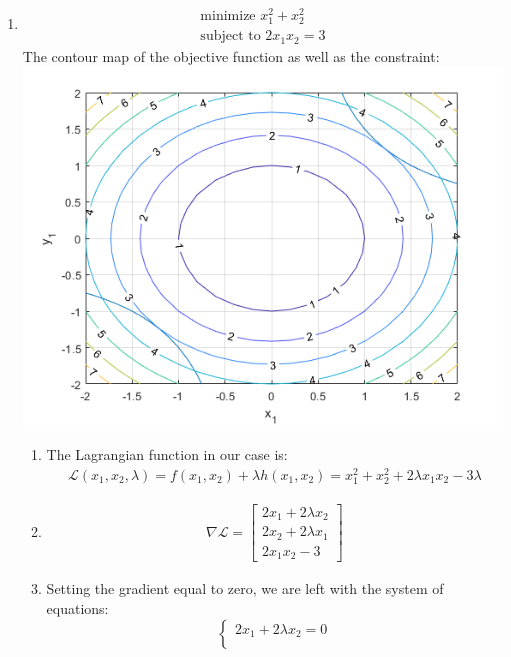 \documentclass[12pt,english]{article}
\begin{document}
\begin{enumerate}
    \item 
    \begin{gather*}
        \text{minimize } x_1^2 + x_2^2 \\
        \text{subject to } 2x_1x_2 = 3
    \end{gather*}
    The contour map of the objective function as well as the constraint: \\
    \includegraphics{a.png}
    \begin{enumerate}
        \item 
        The Lagrangian function in our case is: 
        \begin{gather*}
            \mathcal{L}(x_1, x_2, \lambda) = f(x_1, x_2) + \lambda h(x_1, x_2) = 
            x_1^2 + x_2^2 + 2\lambda x_1x_2 - 3\lambda
        \end{gather*}
        \item
        \begin{gather*}
            \nabla \mathcal{L} = 
            \begin{bmatrix}
                2x_1 + 2\lambda x_2\\
                2x_2+2\lambda x_1 \\
                2x_1x_2 - 3
            \end{bmatrix}
        \end{gather*}
        \item 
        Setting the gradient equal to zero, we are left with the system of equations: 
        \[
        \begin{cases}
            2x_1 + 2\lambda x_2 = 0 \\

\end{cases}\]
\end{enumerate}
\end{enumerate}
\end{document}
